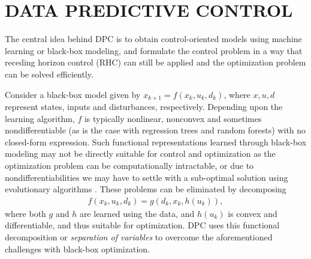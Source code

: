 \section{DATA PREDICTIVE CONTROL}
\label{S:dpc}

The central idea behind DPC is to obtain control-oriented models using machine learning or black-box modeling, and formulate the control problem in a way that receding horizon control (RHC) can still be applied and the optimization problem can be solved efficiently.

Consider a black-box model given by $x_{k+1}=f(x_k,u_k,d_k)$, where $x,u,d$ represent states, inputs and disturbances, respectively. Depending upon the learning algorithm, $f$ is typically nonlinear, nonconvex and sometimes nondifferentiable (as is the case with regression trees and random forests) with no closed-form expression. 
Such functional representations learned through black-box modeling may not be directly suitable for control and optimization as the optimization problem can be computationally intractable, or due to nondifferentiabilities we may have to settle with a sub-optimal solution using evolutionary algorithms \cite{Kusiak2009}.
These problems can be eliminated by decomposing 
\begin{align}
f(x_k,u_k,d_k)= g(d_k,x_k,h(u_k)),
\label{E:sepvars}
\end{align}
where both $g$ and $h$ are learned using the data, and $h(u_k)$ is convex and differentiable, and thus suitable for optimization. DPC uses this functional decomposition or \textit{separation of variables} to overcome the aforementioned challenges with black-box optimization.


